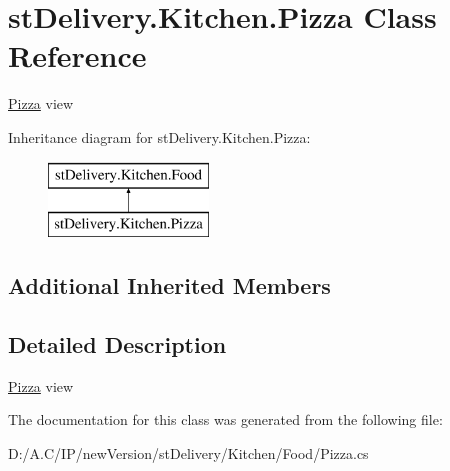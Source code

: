 \hypertarget{classst_delivery_1_1_kitchen_1_1_pizza}{}\section{st\+Delivery.\+Kitchen.\+Pizza Class Reference}
\label{classst_delivery_1_1_kitchen_1_1_pizza}


\hyperlink{classst_delivery_1_1_kitchen_1_1_pizza}{Pizza} view  


Inheritance diagram for st\+Delivery.\+Kitchen.\+Pizza\+:\begin{figure}[H]
\begin{center}
\leavevmode
\includegraphics[height=2.000000cm]{classst_delivery_1_1_kitchen_1_1_pizza}
\end{center}
\end{figure}
\subsection*{Additional Inherited Members}


\subsection{Detailed Description}
\hyperlink{classst_delivery_1_1_kitchen_1_1_pizza}{Pizza} view 



The documentation for this class was generated from the following file\+:\begin{DoxyCompactItemize}
\item 
D\+:/\+A.\+C/\+I\+P/new\+Version/st\+Delivery/\+Kitchen/\+Food/Pizza.\+cs\end{DoxyCompactItemize}
